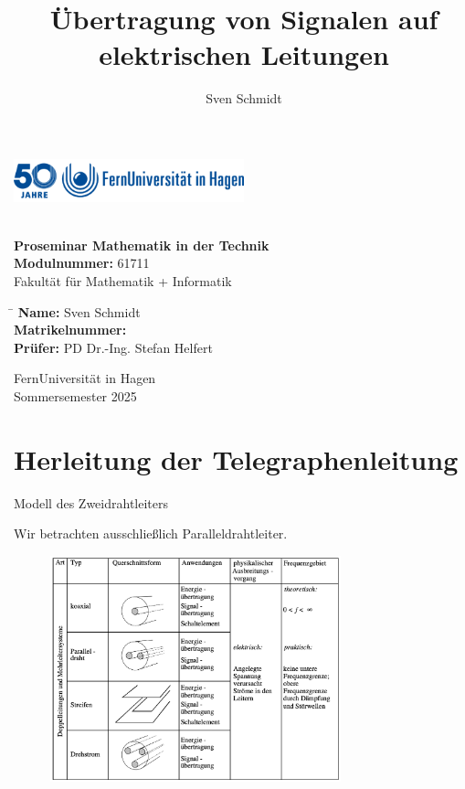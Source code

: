 \documentclass{beamer}
\title{Übertragung von Signalen auf elektrischen Leitungen}
\author{Sven Schmidt}
\begin{document}
\begin{frame}
    \centering
    \includegraphics[width=0.5\textwidth]{logo_fernuni_hagen.png}
    \vspace{0.5cm} %

    {\LARGE \textbf{\inserttitle}}\\[0.5cm]

    \textbf{Proseminar Mathematik in der Technik}\\
    \textbf{Modulnummer:} 61711\\
    Fakultät für Mathematik + Informatik\\[0.5cm]

    \begin{tabbing}
        \hspace{4cm} \= \kill
        \textbf{Name:} \> Sven Schmidt \\
        \textbf{Matrikelnummer:}  \\
        \textbf{Prüfer:} \> PD Dr.-Ing. Stefan Helfert \\
    \end{tabbing}

    \vfill

    {\large FernUniversität in Hagen}\\
    {\large Sommersemester 2025}
\end{frame}


\section{Herleitung der Telegraphenleitung}


\begin{frame}{Modell des Zweidrahtleiters}

Wir betrachten ausschließlich Paralleldrahtleiter.

\begin{figure}[!htb]
    \begin{center}
        \includegraphics[width=0.75\textwidth]{../Ausarbeitung/images/Leiter.png}
    \end{center}
\end{figure}

\end{frame}
\end{document}
